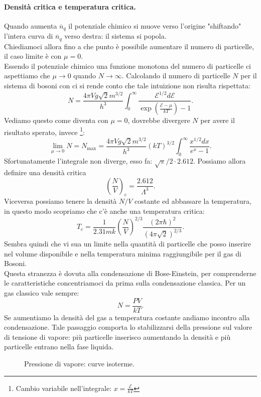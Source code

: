 \paragraph{Densità critica e temperatura critica.}
Quando aumenta $\overline{n}_q$ il potenziale chimico si muove verso l'origine "shiftando" l'intera curva di $\overline{n}_{q}$ verso destra: il sistema si popola. \\
Chiediamoci allora fino a che punto è possibile aumentare il numero di particelle, il caso limite è con $\mu = 0$.\\
Essendo il potenziale chimico una funzione monotona del numero di particelle ci aspettiamo che $\mu \to 0$ quando $N\to \infty$. Calcolando il numero di particelle $N$ per il sistema di bosoni con ci si rende conto che tale intuizione non risulta rispettata:
\[
	N = \frac{4\pi V g \sqrt{2} m ^{3 /2}}{h^3}
	\int_{0}^{\infty} \frac{\mathcal{E} ^{1 /2}d\mathcal{E} }
	{\exp\left( \frac{\mathcal{E} -\mu }{kT} \right) -1} 
.\] 
Vediamo questo come diventa con $\mu = 0$, dovrebbe divergere $N$ per avere il risultato sperato, invece \footnote{Cambio variabile nell'integrale: $x = \frac{\mathcal{E} }{kT}$}:
\[
	\lim_{\mu \to 0} N = N_{\text{max}}= \frac{4\pi V g \sqrt{2} m ^{3 /2}}{h^3} \left( kT \right)^{3 /2} \int_{0}^{\infty} \frac{x^{1 /2}dx}{e^{x}-1} \label{eq:N-critico}
.\] 
Sfortunatamente l'integrale non diverge, esso fa: $ \sqrt{\pi} /2 \cdot 2.612$. Possiamo allora definire una densità critica
\[
	\left( \frac{N}{V} \right)_{\text{c}}= \frac{2.612}{\Lambda ^3}
.\] 
Viceversa possiamo tenere la densità $N /V$ costante ed abbassare la temperatura, in questo modo scopriamo che c'è anche una temperatura critica:
\[
	T_{c} = \frac{1}{2.31 m k} \left( \frac{N}{V} \right)^{2 /3} \frac{\left( 2\pi \hbar  \right) ^2}{\left( 4\pi \sqrt{2}  \right) ^{2 /3}}
.\] 
Sembra quindi che vi sua un limite nella quantità di particelle che posso inserire nel volume disponibile e nella temperatura minima raggiungibile per il gas di Bosoni. \\
Questa stranezza è dovuta alla condensazione di Bose-Einstein, per comprenderne le caratteristiche concentriamoci da prima sulla condensazione classica. 
Per un gas classico vale sempre:
\[
	N = \frac{PV}{kT}
.\] Se aumentiamo la densità del gas a temperatura costante andiamo incontro alla condensazione. Tale passaggio comporta lo stabilizzarsi della pressione sul valore di tensione di vapore: più particelle inserisco aumentando la densità e più particelle entrano nella fase liquida.
\begin{figure}[H]
    \centering
    \caption{Pressione di vapore: curve isoterme.}
    \label{fig:pressione-di-vapore}
\end{figure}

